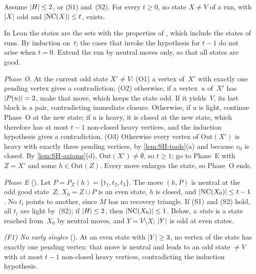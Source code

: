 \begin{lemma}\label{lem:SH-OS}
Assume $\lvert H \rvert\le2$, or (S1) and~(S2). For every $t\ge0$, no state $X\ne V$ of a run, with $\lvert X \rvert$ odd and
$\lvert \mathrm{NC}(X) \rvert\le t$, exists.
\end{lemma}

\begin{outline}
In Lean the states are the sets with the properties of , which include the states of runs. By induction on~$t$; the
cases that invoke the hypothesis for $t-1$ do not arise when $t=0$. Extend the run by neutral moves only, so that all states are
good.

\emph{Phase O.} At the current odd state $X'\ne V$: (O1) a vertex of~$X'$ with exactly one pending vertex gives a
contradiction; (O2) otherwise, if a vertex~$u$ of~$X'$ has $\lvert P(u) \rvert=2$, make that move, which keeps the state odd. If it
yields~$V$, its last block is a pair, contradicting immediate closure. Otherwise, if $u$ is light, continue Phase~O at the new
state; if $u$ is heavy, it is closed at the new state, which therefore has at most $t-1$ non-closed heavy vertices, and the
induction hypothesis gives a contradiction. (O3) Otherwise every vertex of $\mathrm{Out}(X')$ is heavy with exactly three
pending vertices, by \cref{lem:SH-tools}(a) and because $v_0$ is closed. By
\cref{lem:SH-axioms}(d), $\mathrm{Out}(X')\ne\emptyset$, so $t\ge1$; go to Phase~E with $Z=X'$ and some $h\in\mathrm{Out}(Z)$.
Every move enlarges the state, so Phase~O ends.

\emph{Phase E} (). Let $P=P_Z(h)=\{t_1,t_2,t_3\}$. The move $(h,P)$ is neutral at the odd good state~$Z$; $X_0=Z\cup P$ is an
even state, $h$ is closed, and $\lvert \mathrm{NC}(X_0) \rvert\le t-1$. No $t_i$ points to another, since $M$ has no recovery triangle.
If (S1) and (S2) hold, all $t_i$ are light by~(S2); if $\lvert H \rvert\le2$, then $\lvert \mathrm{NC}(X_0) \rvert\le1$. Below, a \emph{state} is a state reached
from~$X_0$ by neutral moves, and $Y=V\setminus X$; $\lvert Y \rvert$ is odd at even states.

\emph{(F1) No early singles} (). At an even state with $\lvert Y \rvert\ge3$, no vertex of the state has exactly one pending vertex:
that move is neutral and leads to an odd state $\ne V$ with at most $t-1$ non-closed heavy vertices, contradicting the induction
hypothesis.


\end{outline}
